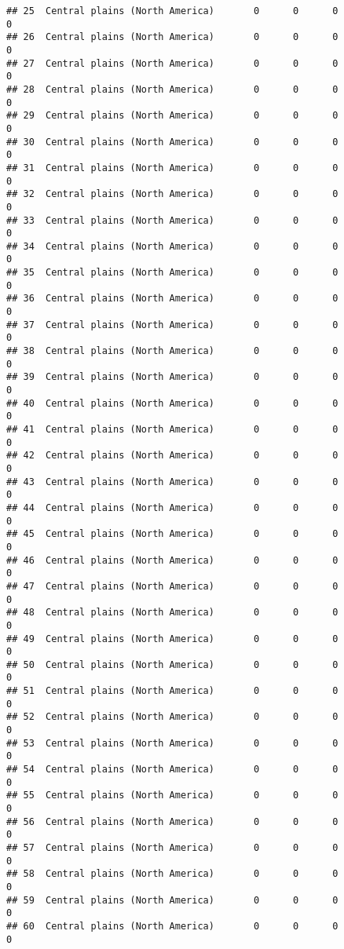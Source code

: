 \documentclass[]{article}
\begin{document}
\begin{verbatim}
## 25  Central plains (North America)       0      0      0             0
## 26  Central plains (North America)       0      0      0             0
## 27  Central plains (North America)       0      0      0             0
## 28  Central plains (North America)       0      0      0             0
## 29  Central plains (North America)       0      0      0             0
## 30  Central plains (North America)       0      0      0             0
## 31  Central plains (North America)       0      0      0             0
## 32  Central plains (North America)       0      0      0             0
## 33  Central plains (North America)       0      0      0             0
## 34  Central plains (North America)       0      0      0             0
## 35  Central plains (North America)       0      0      0             0
## 36  Central plains (North America)       0      0      0             0
## 37  Central plains (North America)       0      0      0             0
## 38  Central plains (North America)       0      0      0             0
## 39  Central plains (North America)       0      0      0             0
## 40  Central plains (North America)       0      0      0             0
## 41  Central plains (North America)       0      0      0             0
## 42  Central plains (North America)       0      0      0             0
## 43  Central plains (North America)       0      0      0             0
## 44  Central plains (North America)       0      0      0             0
## 45  Central plains (North America)       0      0      0             0
## 46  Central plains (North America)       0      0      0             0
## 47  Central plains (North America)       0      0      0             0
## 48  Central plains (North America)       0      0      0             0
## 49  Central plains (North America)       0      0      0             0
## 50  Central plains (North America)       0      0      0             0
## 51  Central plains (North America)       0      0      0             0
## 52  Central plains (North America)       0      0      0             0
## 53  Central plains (North America)       0      0      0             0
## 54  Central plains (North America)       0      0      0             0
## 55  Central plains (North America)       0      0      0             0
## 56  Central plains (North America)       0      0      0             0
## 57  Central plains (North America)       0      0      0             0
## 58  Central plains (North America)       0      0      0             0
## 59  Central plains (North America)       0      0      0             0
## 60  Central plains (North America)       0      0      0             0

\end{verbatim}
\end{document}
